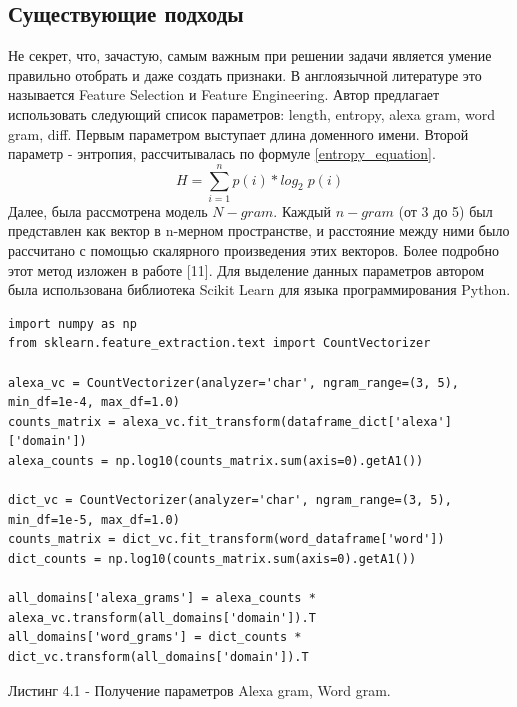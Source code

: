     \subsection{Существующие подходы}\label{be_class_exp}
    Не секрет, что, зачастую, самым важным при решении задачи является умение правильно отобрать и даже создать признаки. В англоязычной литературе это называется Feature Selection и Feature Engineering. Автор предлагает использовать следующий список параметров: length, entropy, alexa gram, word gram, diff.
    Первым параметром выступает длина доменного имени.
    Второй параметр - энтропия, рассчитывалась по формуле \ref{entropy_equation}.
    \begin{equation}\label{entropy_equation}
    H = \sum_{i=1}^{n} p(i)*log_{2}\;p(i{})
    \end{equation}
    Далее, была рассмотрена модель $N-gram$. Каждый $n-gram$ (от 3 до 5) был представлен как вектор в n-мерном пространстве, и расстояние между ними было рассчитано с помощью скалярного произведения этих векторов. Более подробно этот метод изложен в работе [11].
    Для выделение данных параметров автором была использована библиотека Scikit Learn для языка программирования Python.
    \begin{lstlisting}
import numpy as np
from sklearn.feature_extraction.text import CountVectorizer

alexa_vc = CountVectorizer(analyzer='char', ngram_range=(3, 5), min_df=1e-4, max_df=1.0)
counts_matrix = alexa_vc.fit_transform(dataframe_dict['alexa']['domain'])
alexa_counts = np.log10(counts_matrix.sum(axis=0).getA1())

dict_vc = CountVectorizer(analyzer='char', ngram_range=(3, 5), min_df=1e-5, max_df=1.0)
counts_matrix = dict_vc.fit_transform(word_dataframe['word'])
dict_counts = np.log10(counts_matrix.sum(axis=0).getA1())

all_domains['alexa_grams'] = alexa_counts * alexa_vc.transform(all_domains['domain']).T
all_domains['word_grams'] = dict_counts * dict_vc.transform(all_domains['domain']).T
    \end{lstlisting}
    Листинг 4.1 - Получение параметров Alexa gram, Word gram.


